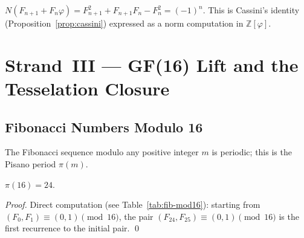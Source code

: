\begin{corollary}\label{cor:cassini-norm}
\(N(F_{n+1} + F_n\varphi) = F_{n+1}^2 + F_{n+1}F_n - F_n^2 = (-1)^n\).
This is Cassini's identity (Proposition~\ref{prop:cassini}) expressed as a
norm computation in \(\mathbb{Z}[\varphi]\).
\end{corollary}

\section{Strand~III — GF(16) Lift and the Tesselation Closure}
\label{sec:ch7-strand3}

\subsection{Fibonacci Numbers Modulo 16}\label{subsec:ch7-mod16}

The Fibonacci sequence modulo any positive integer \(m\) is periodic;
this is the Pisano period \(\pi(m)\).

\begin{proposition}\label{prop:pisano16}
\(\pi(16) = 24\).
\end{proposition}

\begin{proof}
Direct computation (see Table~\ref{tab:fib-mod16}):
starting from \((F_0, F_1) \equiv (0, 1) \pmod{16}\),
the pair \((F_{24}, F_{25}) \equiv (0, 1) \pmod{16}\)
is the first recurrence to the initial pair.
\qed
\end{proof}

\begin{table}[htb]
\centering
\caption{Fibonacci numbers modulo 16 (\(\pi(16)=24\)).}
\label{tab:fib-mod16}
\end{table}

